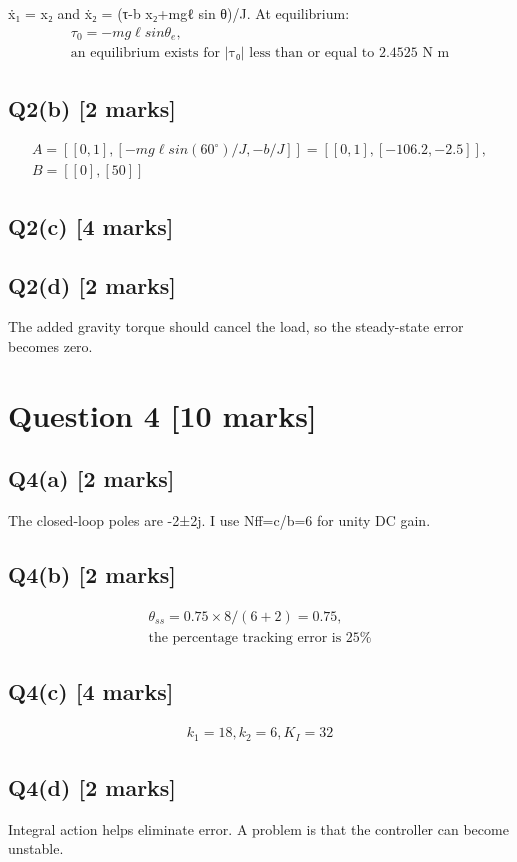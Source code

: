 \documentclass[11pt,a4paper]{article}
\begin{document}
ẋ₁ = x₂ and ẋ₂ = (τ-b x₂+mgℓ sin θ)/J.
At equilibrium:\[\begin{aligned}τ_0 = -mg\ell sin \theta_e,\\ \text{an equilibrium exists for |τ₀| less than or equal to 2.4525 N m}\end{aligned}\]

\subsection*{Q2(b) \hfill [2 marks]}

\[\begin{aligned}A = [[0,1], [-mg\ell sin(60^{\circ})/J, -b/J]] = [[0,1], [-106.2, -2.5]],\\ B = [[0],[50]]\end{aligned}\]

\subsection*{Q2(c) \hfill [4 marks]}

\vspace{2mm}

\subsection*{Q2(d) \hfill [2 marks]}

The added gravity torque should cancel the load, so the steady-state error becomes zero. 
\section*{Question 4 \hfill [10 marks]}
\subsection*{Q4(a) \hfill [2 marks]}

The closed-loop poles are -2±2j.
I use Nff=c/b=6 for unity DC gain.

\subsection*{Q4(b) \hfill [2 marks]}

\[\begin{aligned}\theta_{ss} = 0.75\times8/(6+2)=0.75,\\ \text{the percentage tracking error is 25\%}\end{aligned}\]

\subsection*{Q4(c) \hfill [4 marks]}

\[\begin{aligned}k_1=18, k_2=6, K_I=32\end{aligned}\]

\subsection*{Q4(d) \hfill [2 marks]}

Integral action helps eliminate error.
A problem is that the controller can become unstable.
\end{document}
